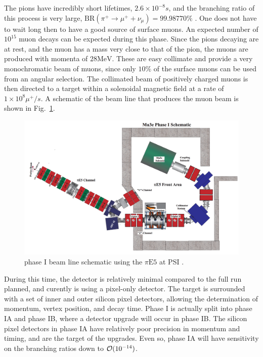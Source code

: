 \noindent The pions have incredibly short lifetimes, $2.6 \times 10^{-8}s$, and the branching ratio of this process is very large, $\textrm{BR}(\pi^+ \rightarrow \mu^+ + \nu_\mu) = 99.98770\%$ \cite{Agashe:2014kda}.
One does not have to wait long then to have a good source of surface muons.
An expected number of $10^{15}$ muon decays can be expected during this phase.
Since the pions decaying are at rest, and the muon has a mass very close to that of the pion, the muons are produced with momenta of $28\textrm{MeV}$.
These are easy collimate and provide a very monochromatic beam of muons, since only $10\%$ of the surface muons can be used from an angular selection.
The collimated beam of positively charged muons is then directed to a target within a solenoidal magnetic field at a rate of $1 \times 10^8 \mu^+/s$.
A schematic of the beam line that produces the muon beam is shown in Fig.\ \ref{fig:mu3e_phaseI_schematic}.

\begin{figure}[h]
    \centering
    \includegraphics[width = \textwidth]{Figures/experiments/mu3e_phase1_schematic.png}
    \caption{\mueee phase I beam line schematic using the $\pi\textrm{E5}$ at PSI \cite{Blondel:2013ia}.}
    \label{fig:mu3e_phaseI_schematic}
\end{figure}

During this time, the detector is relatively minimal compared to the full run planned, and curently is using a pixel-only detector.
The target is surrounded with a set of inner and outer silicon pixel detectors, allowing the determination of momentum, vertex position, and decay time.
Phase I is actually split into phase IA and phase IB, where a detector upgrade will occur in phase IB\@.
The silicon pixel detectors in phase IA have relatively poor precision in momentum and timing, and are the target of the upgrades.
Even so, phase IA will have sensitivity on the branching ratios down to $\operatorname{\mathcal{O}}(10^{-14})$.


